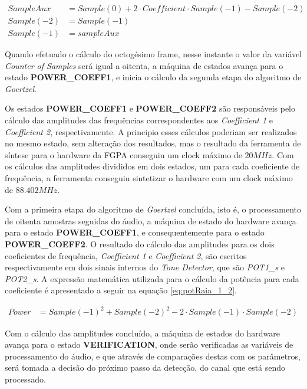 \documentclass[monografia]{subfiles}
\begin{document}
				\begin{align}
					SampleAux & = Sample(0) + 2 \cdot Coefficient \cdot Sample(-1) - Sample(-2)\\
					Sample(-2) & = Sample(-1)\\
					Sample(-1) & = sampleAux
				\end{align}

				Quando efetuado o cálculo do octogésimo frame, nesse instante o valor da variável \textit{Counter of Samples} será igual a oitenta,
				a máquina de estados avança para o estado \textbf{POWER\_COEFF1}, e inicia o cálculo da segunda	etapa do algoritmo de \textit{Goertzel}.

				\newpage

			\label{sec:hardwareStatePOWERCOEFF}

				Os estados \textbf{POWER\_COEFF1} e \textbf{POWER\_COEFF2} são responsáveis pelo cálculo das amplitudes das frequências correspondentes aos
				\textit{Coefficient 1} e \textit{Coefficient 2}, respectivamente. A principio esses cálculos poderiam ser realizados no mesmo estado, 
				sem alteração dos resultados, mas o resultado da ferramenta de síntese para o hardware da FGPA conseguiu um clock máximo de $20 MHz$. 
				Com os cálculos das amplitudes divididos em dois estados, um para cada coeficiente de frequência, a ferramenta conseguiu sintetizar
				o hardware com um clock máximo de $88.402 MHz$. 
				
				Com a primeira etapa do algoritmo de \textit{Goertzel} concluída, isto é, o processamento de oitenta amostras seguidas do áudio,
				a máquina de estado do hardware avança para o estado \textbf{POWER\_COEFF1}, e consequentemente para o estado \textbf{POWER\_COEFF2}.
				O resultado do cálculo das amplitudes para os dois coeficientes de frequência, 
				\textit{Coefficient 1} e \textit{Coefficient 2}, são escritos respectivamente em dois sinais internos do 
				\textit{Tone Detector}, que são \textit{POT1\_s} e \textit{POT2\_s}.
				A expressão matemática utilizada para o cálculo da potência para cada coeficiente é apresentado a seguir na equação \ref{eq:potRaia_1_2}.

				\begin{align}
				\label{eq:potRaia_1_2}
					Power & = Sample(-1)^{2} +  Sample(-2)^{2} -  2 \cdot Sample(-1) \cdot Sample(-2)
				\end{align}

				Com o cálculo das amplitudes concluído, a máquina de estados do hardware avança para o estado \textbf{VERIFICATION}, onde serão verificadas
				as variáveis de processamento do áudio, e que através de comparações destas com os parâmetros, será tomada a decisão do próximo passo da
				detecção, do canal que está sendo processado.
\end{document}
